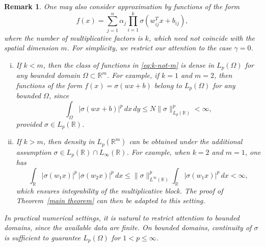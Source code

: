 \documentclass[11pt,reqno]{amsart}
\numberwithin{equation}{section}
\newtheorem{remark}[theorem]{\bf{Remark}}
\theoremstyle{remark}
\theoremstyle{definition}
\newcommand\bR{\mathbb{R}}
\begin{document}
\begin{remark}
One may also consider approximation by functions of the form
\begin{equation}
\label{eq:k-not-m}
f(x)
=
\sum_{j=1}^{n}\alpha_j
\prod_{i=1}^{k}\sigma\!\left(w_{ij}^T x + b_{ij}\right),
\end{equation}
where the number of multiplicative factors is $k$, which need not coincide with the spatial
dimension $m$.
For simplicity, we restrict our attention to the case $\gamma=0$.

\begin{enumerate}[(i)]
\item
If $k<m$, then the class of functions in \eqref{eq:k-not-m} is dense in $L_p(\Omega)$ for any
bounded domain $\Omega\subset\mathbb{R}^m$.
For example, if $k=1$ and $m=2$, then functions of the form
$f(x)=\sigma(wx+b)$ belong to $L_{p}(\Omega)$ for any bounded $\Omega$, since
\[
\int_\Omega |\sigma(wx+b)|^p\,dx\,dy
\le N\|  \sigma\|_{L_{p}(\bR)}^{p} < \infty,
\]
provided $\sigma\in L_{p}(\bR)$.

\item
If $k>m$, then density in $L_p(\mathbb{R}^m)$ can be obtained under the additional assumption
$\sigma\in L_p(\mathbb{R})\cap L_\infty(\mathbb{R})$.
For example, when $k=2$ and $m=1$, one has
\[
\int_{\mathbb{R}} |\sigma(w_1 x)|^p\,|\sigma(w_2 x)|^p\,dx
\le \|\sigma\|_{L^\infty(\mathbb{R})}^p
\int_{\mathbb{R}} |\sigma(w_1 x)|^p\,dx < \infty,
\]
which ensures integrability of the multiplicative block.
The proof of Theorem~\ref{main theorem} can then be adapted to this setting.
\end{enumerate}

In practical numerical settings, it is natural to restrict attention to bounded domains,
since the available data are finite.
On bounded domains, continuity of $\sigma$ is sufficient to guarantee 
$L_{p}(\Omega)$ for $1<p\le\infty$.
\end{remark}

\end{document}

